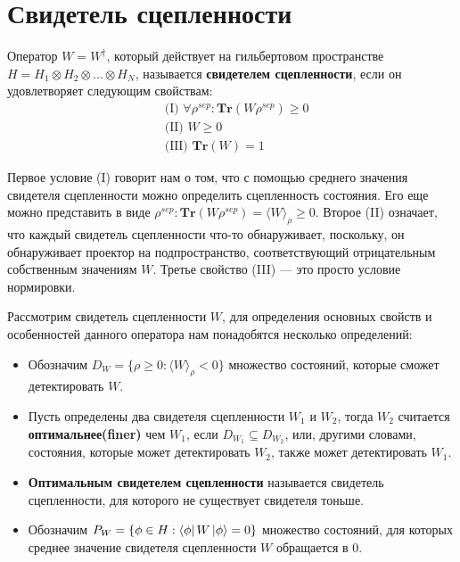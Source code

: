 \section{Свидетель сцепленности}
\begin{definition}\label{ew-def}
Оператор $W = W^{\dag}$, который действует на гильбертовом пространстве $H = H_1 \otimes H_2 \otimes ... \otimes H_N$, называется \textbf{свидетелем сцепленности}, если он удовлетворяет следующим свойствам:
\begin{equation}
    \begin{split}
        & \text{(I) } \forall \rho^{sep}: \textbf{Tr}(W\rho^{sep}) \geq 0 \\
        & \text{(II) } W \geq 0 \\
        & \text{(III) }\textbf{Tr}(W) = 1 
    \end{split}
\end{equation}

\end{definition}

Первое условие (I) говорит нам о том, что с помощью среднего значения свидетеля сцепленности можно определить сцепленность состояния. Его еще можно представить в виде $\rho^{sep}: \textbf{Tr}(W\rho^{sep}) = \langle W \rangle_{\rho} \geq 0$. Второе (II) означает, что каждый свидетель сцепленности что-то обнаруживает, поскольку, он обнаруживает проектор на подпространство, соответствующий отрицательным собственным значениям $W$. Третье свойство (III) — это просто условие нормировки. 


Рассмотрим свидетель сцепленности $W$, для определения основных свойств и особенностей данного оператора нам понадобятся несколько определений:

\begin{itemize}
  \item Обозначим $D_W = \{ \rho \geq 0: \langle W \rangle_{\rho} < 0 \}$ множество состояний, которые сможет детектировать $W$.

  \item Пусть определены два свидетеля сцепленности $W_1$ и $W_2$, тогда $W_2$ считается \textbf{оптимальнее(finer)} чем $W_1$, если $D_{W_1} \subseteq D_{W_2}$, или, другими словами, состояния, которые может детектировать $W_2$, также может детектировать $W_1$.

  \item \textbf{Оптимальным свидетелем сцепленности} называется свидетель сцепленности, для которого не существует свидетеля тоньше.

  \item Обозначим $P_W = \{ \phi \in H: \bra{\phi} W \ket{\phi} = 0 \}$ множество состояний, для которых среднее значение свидетеля сцепленности $W$ обращается в $0$.
\end{itemize}


